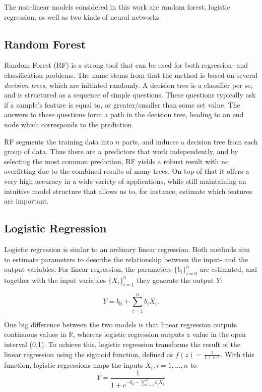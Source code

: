 The non-linear models considered in this work are random forest, logistic regression, as well as two kinds of neural networks.

\subsection*{Random Forest}
Random Forest (RF) is a strong tool that can be used for both regression- and classification problems. The name stems from that the method is based on several \textit{decision trees}, which are initiated randomly. A decision tree is a classifier per se, and is structured as a sequence of simple questions. These questions typically ask if a sample's feature is equal to, or greater/smaller than some set value. The answers to these questions form a path in the decision tree, leading to an end node which corresponds to the prediction.

RF segments the training data into $n$ parts, and induces a decision tree from each group of data. Thus there are $n$ predictors that work independently, and by selecting the most common prediction, RF yields a robust result with no overfitting due to the combined results of many trees. On top of that it offers a very high accuracy in a wide variety of applications, while still maintaining an intuitive model structure that allows us to, for instance, estimate which features are important. \citep{breiman_cutler_2018}


\subsection*{Logistic Regression}
Logistic regression is simlar to an ordinary linear regression. Both methods aim to estimate parameters to describe the relationship between the input- and the output variables. For linear regression, the parameters $\{b_i\}_{i=0}^n$ are estimated, and together with the input variables $\{X_i\}_{i=1}^n$ they generate the output $Y$:

\begin{equation}
	Y= b_0+\sum_{i=1}^n b_iX_i.
\end{equation}

One big difference between the two models is that linear regression outputs continuous values in $\mathbb{R}$, whereas logistic regression outputs a value in the open interval (0,1).  To achieve this, logistic regression transforms the result of the linear regression using the sigmoid function, defined as $f(z)=\frac{1}{1+e^{-z}}$. With this function, logistic regressions maps the inputs $X_i, i=1,...,n$ to
\begin{equation}
	Y= \frac{1}{1+e^{-b_0-\sum_{i=1}^n b_iX_i}}
\end{equation}

